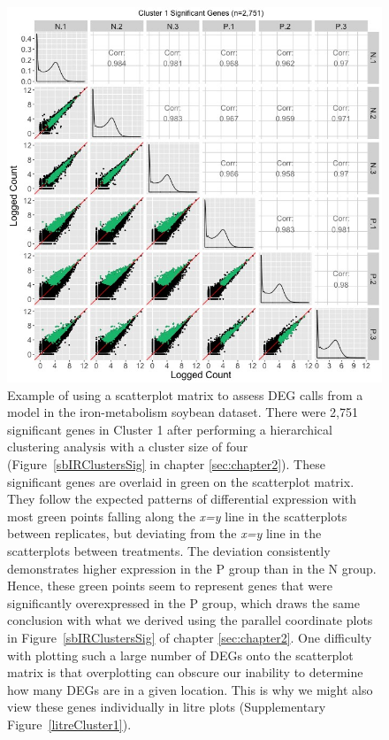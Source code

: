 \documentclass[11pt,a4paper,oldfontcommands,openany]{memoir}
\numberwithin{equation}{section} %
\begin{document}
\clearpage
\null
\begin{figure}[t!]
\begin{framed}
\centerline{\includegraphics[width=\columnwidth]{MakeFigures/sbIRClusterSigSM1.jpg}}
\end{framed}
\caption{Example of using a scatterplot matrix to assess DEG calls from a model in the iron-metabolism soybean dataset. There were 2,751 significant genes in Cluster 1 after performing a hierarchical clustering analysis with a cluster size of four (Figure~\ref{sbIRClustersSig} in chapter \ref{sec:chapter2}). These significant genes are overlaid in green on the scatterplot matrix. They follow the expected patterns of differential expression with most green points falling along the \textit{x=y} line in the scatterplots between replicates, but deviating from the \textit{x=y} line in the scatterplots between treatments. The deviation consistently demonstrates higher expression in the P group than in the N group. Hence, these green points seem to represent genes that were significantly overexpressed in the P group, which draws the same conclusion with what we derived using the parallel coordinate plots in Figure~\ref{sbIRClustersSig} of chapter \ref{sec:chapter2}. One difficulty with plotting such a large number of DEGs onto the scatterplot matrix is that overplotting can obscure our inability to determine how many DEGs are in a given location. This is why we might also view these genes individually in litre plots (Supplementary Figure~\ref{litreCluster1}).
\label{sbIRClusterSigSM1}}
\end{figure}
\end{document}
